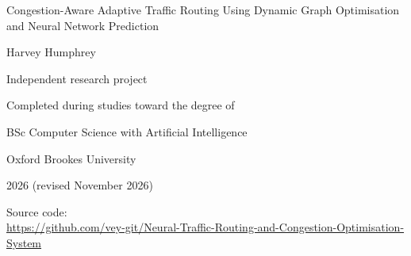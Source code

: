\documentclass[12pt]{report}
\begin{document}

\begin{titlepage}
\centering
\vspace*{2cm}

{\Huge Congestion-Aware Adaptive Traffic Routing Using Dynamic Graph Optimisation and Neural Network Prediction\par}

\vspace{2cm}
{\Large Harvey Humphrey\par}

\vspace{1cm}
{\large Independent research project\par}

\vspace{0.5cm}
{\large Completed during studies toward the degree of\par}
\vspace{0.3cm}
{\Large BSc Computer Science with Artificial Intelligence\par}
\vspace{0.3cm}
{\large Oxford Brookes University\par}

\vspace{1.5cm}
{\large 2026 \quad (revised November 2026)\par}

\vfill
{\normalsize Source code:\\
\url{https://github.com/vey-git/Neural-Traffic-Routing-and-Congestion-Optimisation-System}\par}
\end{titlepage}

\end{document}
